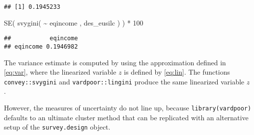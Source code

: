 \documentclass[
]{book}
\newenvironment{Shaded}{\begin{snugshade}}{\end{snugshade}}
\newcommand{\DecValTok}[1]{\textcolor[rgb]{0.00,0.00,0.81}{#1}}
\newcommand{\FunctionTok}[1]{\textcolor[rgb]{0.00,0.00,0.00}{#1}}
\newcommand{\NormalTok}[1]{#1}
\newcommand{\SpecialCharTok}[1]{\textcolor[rgb]{0.00,0.00,0.00}{#1}}
\begin{document}
\begin{verbatim}
## [1] 0.1945233
\end{verbatim}

\begin{Shaded}
\begin{Highlighting}[]
\FunctionTok{SE}\NormalTok{( }\FunctionTok{svygini}\NormalTok{( }\SpecialCharTok{\textasciitilde{}}\NormalTok{ eqincome , des\_eusilc ) ) }\SpecialCharTok{*} \DecValTok{100}
\end{Highlighting}
\end{Shaded}

\begin{verbatim}
##           eqincome
## eqincome 0.1946982
\end{verbatim}

The variance estimate is computed by using the approximation defined in \eqref{eq:var}, where the linearized variable \(z\) is defined by \eqref{eq:lin}. The functions \texttt{convey::svygini} and \texttt{vardpoor::lingini} produce the same linearized variable \(z\).

However, the measures of uncertainty do not line up, because \texttt{library(vardpoor)} defaults to an ultimate cluster method that can be replicated with an alternative setup of the \texttt{survey.design} object.
\end{document}
